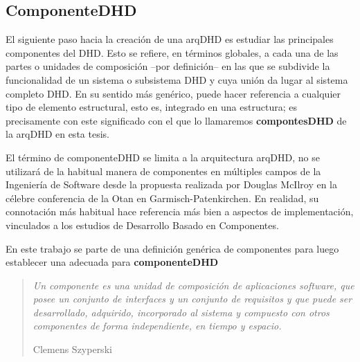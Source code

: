 \subsection {ComponenteDHD} 


El siguiente paso hacia la creación de una arqDHD es estudiar las principales componentes del DHD. Esto se refiere, en términos globales, a cada una de las partes o unidades de composición –por definición– en las que se subdivide la funcionalidad de un sistema o subsistema DHD y cuya unión da lugar al sistema completo DHD. En su sentido más genérico, puede hacer referencia a cualquier tipo de elemento estructural, esto es, integrado en una estructura; es precisamente con este significado con el que lo llamaremos \textbf{compontesDHD} de la arqDHD en esta tesis.

El término de componenteDHD se limita a la arquitectura arqDHD, no se utilizará  de la habitual manera de componentes en múltiples campos de la Ingeniería de Software desde la propuesta realizada por Douglas McIlroy \cite{Douglas} en la célebre conferencia de la Otan en Garmisch-Patenkirchen. En realidad, su connotación más habitual hace referencia más bien a aspectos de implementación, vinculados a los estudios de Desarrollo Basado en Componentes. 

En este trabajo se parte de una definición genérica de componentes para luego establecer una adecuada para \textbf{componenteDHD}


\begin{quote}

\textit{Un componente es una unidad de composición de aplicaciones
software, que posee un conjunto de interfaces y un conjunto de requisitos y que puede ser desarrollado, adquirido, incorporado al sistema y compuesto con otros componentes de forma independiente, en tiempo y espacio.
}
\begin{flushright} Clemens Szyperski \cite{cacic2007.7} \end{flushright}

\end{quote}


